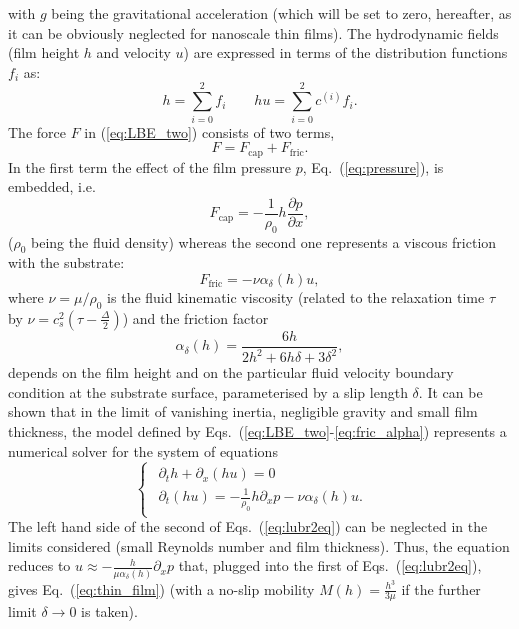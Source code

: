with $g$ being the gravitational acceleration (which will be set to zero, hereafter, as it can be obviously neglected for nanoscale thin films).
The hydrodynamic fields (film height $h$ and velocity $u$) are expressed in terms of the distribution functions $f_i$ as:
\begin{equation}\label{eq:hydrofields}
h= \sum_{i=0}^2 f_i \qquad hu = \sum_{i=0}^2 c^{(i)} f_i.
\end{equation}
The force $F$ in (\ref{eq:LBE_two}) consists of two terms,
\begin{equation}\label{eq:force_two}
F = F_{\text{cap}} + F_{\text{fric}}.  
\end{equation}
In the first term the effect of the film pressure $p$, Eq.~(\ref{eq:pressure}), is embedded, i.e. 
\begin{equation}\label{eq:capillary_force}
    F_{\text{cap}} = -\frac{1}{\rho_0} h \frac{\partial p}{\partial x},
\end{equation}
($\rho_0$ being the fluid density) whereas the second one represents a viscous friction with the substrate:
\begin{equation}\label{eq:fric_force}
    F_{\text{fric}} = -\nu \alpha_{\delta}(h) u,
\end{equation}
where $\nu=\mu/\rho_0$ is the fluid kinematic viscosity (related to the relaxation time $\tau$ by $\nu = c_s^2\left(\tau-\frac{\Delta}{2}\right)$) and the friction factor
\begin{equation}\label{eq:fric_alpha}
     \alpha_{\delta}(h) = \frac{6 h}{2h^2 + 6h\delta + 3\delta^2},
\end{equation}
depends on the film height and on the particular fluid velocity boundary condition at the substrate surface, parameterised by a slip length $\delta$.
It can be shown that in the limit of vanishing inertia, negligible gravity and small film thickness, the model defined by Eqs.~(\ref{eq:LBE_two}-\ref{eq:fric_alpha}) represents a numerical solver for the system of equations
\begin{equation}\label{eq:lubr2eq}
  \begin{cases}
    \begin{array}{ll}
      \partial_t h + \partial_x (h u)  = 0 & \\ 
      \partial_t (h u) = -\frac{1}{\rho_0}h\partial_x p -\nu\alpha_{\delta}(h)u.
    \end{array}
  \end{cases}
\end{equation}
The left hand side of the second of Eqs.~(\ref{eq:lubr2eq}) can be neglected in the limits considered (small Reynolds number and film thickness). 
Thus, the equation reduces to $u \approx -\frac{h}{\mu\alpha_{\delta}(h)}\partial_x p$ that, plugged into the first of Eqs.~(\ref{eq:lubr2eq}), gives Eq.~(\ref{eq:thin_film}) (with a no-slip mobility $M(h)=\frac{h^3}{3\mu}$ if the further limit $\delta \rightarrow 0$ is taken).

